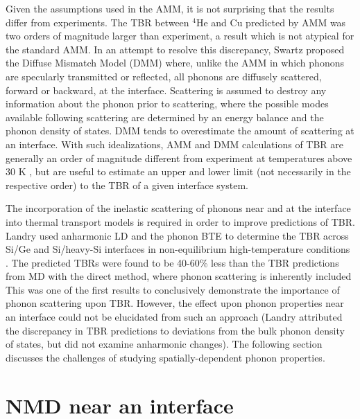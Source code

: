 Given the assumptions used in the AMM, it is not surprising that the results differ from experiments. The TBR between $^4$He and Cu predicted by AMM was two orders of magnitude larger than experiment, a result which is not atypical for the standard AMM. In an attempt to resolve this discrepancy, Swartz proposed the Diffuse Mismatch Model (DMM) \cite{swartz1987thermal} where, unlike the AMM in which phonons are specularly transmitted or reflected, all phonons are diffusely scattered, forward or backward, at the interface. Scattering is assumed to destroy any information about the phonon prior to scattering, where the possible modes available following scattering are determined by an energy balance and the phonon density of states. DMM tends to overestimate the amount of scattering at an interface. With such idealizations, AMM and DMM calculations of TBR are generally an order of magnitude different from experiment at temperatures above 30 K \cite{landrythesis}, but are useful to estimate an upper and lower limit (not necessarily in the respective order) to the TBR of a given interface system.

The incorporation of the inelastic scattering of phonons near and at the interface  into thermal transport models is required in order to improve predictions of TBR. Landry used anharmonic LD and the phonon BTE to determine the TBR across Si/Ge and Si/heavy-Si interfaces in non-equilibrium high-temperature conditions \cite{landrythesis}. The predicted TBRs were found to be 40-60\% less than the TBR predictions from MD with the direct method, where phonon scattering is inherently included This was one of the first results to conclusively demonstrate the importance of phonon scattering upon TBR. However, the effect upon phonon properties near an interface could not be elucidated from such an approach (Landry attributed the discrepancy in TBR predictions to deviations from the bulk phonon density of states, but did not examine anharmonic changes). The following section discusses the challenges of studying spatially-dependent phonon properties.

\section{NMD near an interface}

